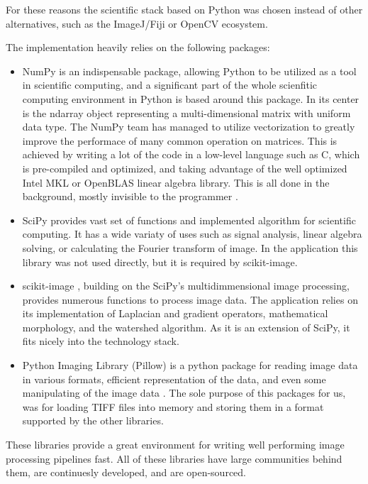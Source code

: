 \documentclass[
  digital,     %
  oneside,     %
  nosansbold,  %
  nocolorbold, %
  lof,         %
  lot,         %
]{fithesis4}
\begin{document}
For these reasons the scientific stack based on Python was chosen instead of
other alternatives, such as the ImageJ/Fiji or OpenCV ecosystem.

The implementation heavily relies on the following packages:
\begin{itemize}
    \item{NumPy \cite{harris2020array} is an indispensable package, allowing
        Python to be utilized as a tool in scientific computing, and a
        significant part of the whole scienfitic computing environment in Python
        is based around this package. In its center is the ndarray object
        representing a multi-dimensional matrix with uniform data type. The
        NumPy team has managed to utilize vectorization to greatly improve the
        performace of many common operation on matrices. This is achieved by
        writing a lot of the code in a low-level language such as C, which is
        pre-compiled and optimized, and taking advantage of the well optimized
        Intel MKL or OpenBLAS linear algebra library. This is all done in the
        background, mostly invisible to the programmer \cite{numpyManual2022}.}
    \item{SciPy \cite{2020SciPy-NMeth} provides vast set of functions and
        implemented algorithm for scientific computing. It has a wide variaty of
        uses such as signal analysis, linear algebra solving, or calculating the
        Fourier transform of image. In the application this library was not used
        directly, but it is required by scikit-image.}
    \item{scikit-image \cite{scikit-image}, building on the SciPy's
        multidimmensional image processing, provides numerous functions to
        process image data. The application relies on its implementation of
        Laplacian and gradient operators, mathematical morphology, and the watershed
        algorithm. As it is an extension of SciPy, it fits nicely into the
        technology stack.}
    \item{Python Imaging Library (Pillow) is a python package for reading image
        data in various formats, efficient representation of the data, and even
        some manipulating of the image data \cite{clarkc20102023}. The sole
        purpose of this packages for us, was for loading TIFF files into memory
        and storing them in a format supported by the other libraries.}
\end{itemize}
These libraries provide a great environment for writing well performing image
processing pipelines fast. All of these libraries have large communities
behind them, are continuesly developed, and are open-sourced.
\end{document}
